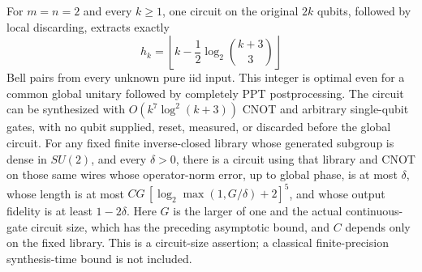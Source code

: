 \begin{proposition}\label{prop:pure-circuit}
For $m=n=2$ and every $k\ge1$, one circuit on the original $2k$ qubits, followed by local discarding, extracts exactly
\[
 h_k=\left\lfloor k-\frac12\log_2\binom{k+3}{3}\right\rfloor
\]
Bell pairs from every unknown pure iid input. This integer is optimal even for a common global unitary followed by completely PPT postprocessing. The circuit can be synthesized with $O(k^7\log^2(k+3))$ CNOT and arbitrary single-qubit gates, with no qubit supplied, reset, measured, or discarded before the global circuit. For any fixed finite inverse-closed library whose generated subgroup is dense in $SU(2)$, and every $\delta>0$, there is a circuit using that library and CNOT on those same wires whose operator-norm error, up to global phase, is at most $\delta$, whose length is at most $C G\,[\log_2\max(1,G/\delta)+2]^5$, and whose output fidelity is at least $1-2\delta$. Here $G$ is the larger of one and the actual continuous-gate circuit size, which has the preceding asymptotic bound, and $C$ depends only on the fixed library. This is a circuit-size assertion; a classical finite-precision synthesis-time bound is not included.
\end{proposition}
